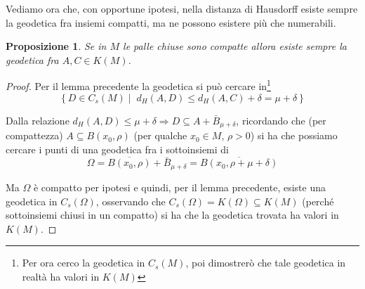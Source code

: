 \documentclass[a4paper,10pt]{article}
\newcounter{counter1}
\theoremstyle{plain}
\newtheorem{mypro}[counter1]{Proposizione}
\theoremstyle{definition}
\theoremstyle{remark}
\newcommand{\obar}[1]{\overline{#1}}
\newcommand{\set}[1]{\left\{#1\right\}}
\begin{document}
Vediamo ora che, con opportune ipotesi, nella distanza di Hausdorff
esiste sempre la geodetica fra insiemi compatti, ma ne possono
esistere più che numerabili.

\begin{mypro}
  Se in $M$ le palle chiuse sono compatte allora esiste sempre la
  geodetica fra $A,C \in K(M)$.
\end{mypro}
\begin{proof}
  Per il lemma precedente la geodetica si può cercare in\footnote{Per
    ora cerco la geodetica in $C_s(M)$, poi dimostrerò che tale
    geodetica in realtà ha valori in $K(M)$}
  \[ \set{D \in C_s(M) \mid \; d_H(A,D) \le d_H(A,C) + \delta= \mu +
    \delta } \]

  Dalla relazione $d_H(A,D) \le \mu + \delta \Rightarrow D \subseteq A
  + \bar B _{\mu + \delta}$, ricordando che (per compattezza) $A \subseteq
  B(x_0,\rho)$ (per qualche $x_0 \in M$, $\rho >0$) si ha che possiamo
  cercare i punti di una geodetica fra i sottoinsiemi di
  \[ \Omega = \obar{B(x_0,\rho)} + \bar B _{\mu + \delta} = \obar{ B
    (x_0, \rho + \mu + \delta) } \]

  Ma $\Omega$ è compatto per ipotesi e quindi, per il lemma
  precedente, esiste una geodetica in $C_s(\Omega)$, osservando che
  $C_s(\Omega) = K(\Omega) \subseteq K(M)$ (perché sottoinsiemi chiusi
  in un compatto) si ha che la geodetica trovata ha valori in $K(M)$.
\end{proof}
\end{document}
